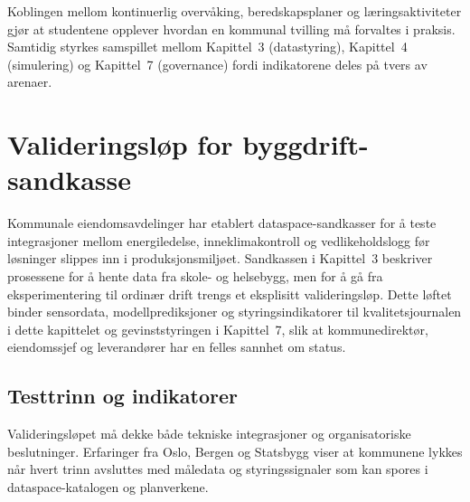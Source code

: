 Koblingen mellom kontinuerlig overvåking, beredskapsplaner og læringsaktiviteter gjør at studentene opplever hvordan en kommunal tvilling må forvaltes i praksis. Samtidig styrkes samspillet mellom Kapittel~3 (datastyring), Kapittel~4 (simulering) og Kapittel~7 (governance) fordi indikatorene deles på tvers av arenaer.

\section{Valideringsløp for byggdrift-sandkasse}
Kommunale eiendomsavdelinger har etablert dataspace-sandkasser for å teste integrasjoner mellom energiledelse, inneklimakontroll og vedlikeholdslogg før løsninger slippes inn i produksjonsmiljøet.\citep{osloeiendom2023strategi,bergen2024smartbygg} Sandkassen i Kapittel~3 beskriver prosessene for å hente data fra skole- og helsebygg, men for å gå fra eksperimentering til ordinær drift trengs et eksplisitt valideringsløp. Dette løftet binder sensordata, modellprediksjoner og styringsindikatorer til kvalitetsjournalen i dette kapittelet og gevinststyringen i Kapittel~7, slik at kommunedirektør, eiendomssjef og leverandører har en felles sannhet om status.

\subsection{Testtrinn og indikatorer}
Valideringsløpet må dekke både tekniske integrasjoner og organisatoriske beslutninger. Erfaringer fra Oslo, Bergen og Statsbygg viser at kommunene lykkes når hvert trinn avsluttes med måledata og styringssignaler som kan spores i dataspace-katalogen og planverkene.\citep{osloeiendom2023strategi,oslo2024klimaeiendom,statsbygg2023digitalmodenhet}

